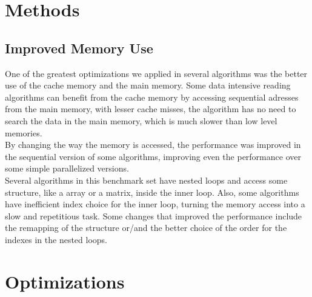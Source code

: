 \documentclass[10pt,a4paper]{report}
\author{}
\title{}
\date{September 28, 2013}
\begin{document}
\maketitle

	\tableofcontents

\chapter{Methods}

\section{Improved Memory Use}

One of the greatest optimizations we applied in several algorithms was the better use of the cache memory and the main memory. Some data intensive reading algorithms can benefit from the cache memory by accessing sequential adresses from the main memory, with lesser cache misses, the algorithm has no need to search the data in the main memory, which is much slower than low level memories. \\

By changing the way the memory is accessed, the performance was improved in the sequential version of some algorithms, improving even the performance over some simple parallelized versions.\\

Several algorithms in this benchmark set have nested loops and access some structure, like a array or a matrix, inside the inner loop. Also, some algorithms have inefficient index choice for the inner loop, turning the memory access into a slow and repetitious task. Some changes that improved the performance include the remapping of the structure or/and the better choice of the order for the indexes in the nested loops. \\


\chapter{Optimizations}

\newpage
\end{document}
